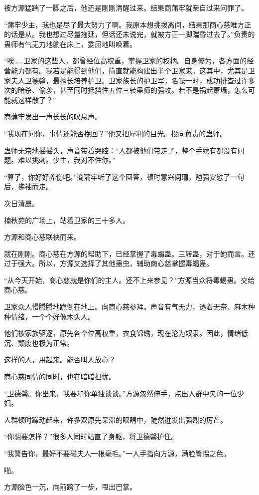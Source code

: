 \begin{this_body}
被方源猛踹了一脚之后，他还是刚刚清醒过来。结果商蒲牢就亲自过来问罪了。

“蒲牢少主，我也是尽了最大努力了啊。我原本想挑拨离间，结果那商心慈唯方正的话是从。我也想过尽量拖延，但话还未说完，就被方正一脚踹昏过去了。”负责的蛊师有气无力地躺在床上，委屈地叫唤着。

“唉……卫家的这些人，都曾经位高权重，掌握卫家的权柄。自身修为，各方面的经营能力都有。我若是能得到他们，简直就能构建出半个卫家来。这其中，尤其是卫家夫人卫德馨，最擅长培养护卫。卫家族长的护卫军，名噪一时，成功排查过许多次的暗杀、偷袭，甚至同时抵挡住五位三转蛊师的强攻。若不是祸起萧墙，怎么可能就这样散了？”

商蒲牢发出一声长长的叹息声。

“我现在问你，事情还能否挽回？”他又把犀利的目光。投向负责的蛊师。

蛊师无奈地摇摇头，声音带着哭腔：“人都被他们带走了，整个手续有都没有问题。难以挑刺。少主，我对不住你。”

“算了，你好好养伤吧。”商蒲牢听了这个回答，顿时意兴阑珊，勉强安慰了一句后，拂袖而走。

次日清晨。

楠秋苑的广场上，站着卫家的三十多人。

方源和商心慈联袂而来。

就在刚刚。商心慈在方源的帮助下，已经掌握了毒蝎蛊。三转蛊，对于她而言。还过于强大。所以，方源又选择了其他蛊虫，辅助商心慈掌握毒蝎蛊。

“从今天开始，商心慈就是你们的主人。还不上来参见？”方源当众将毒蝎蛊。交给商心慈。

卫家众人慢腾腾地跪倒在地上。向商心慈参拜。声音有气无力，透着无奈、麻木种种情绪，一个个好像木头人。

他们被家族驱逐，原先各个位高权重，衣食锦绣，现在沦为奴隶。因此，情绪低沉、颓废也极为正常。

这样的人，用起来。能否叫人放心？

商心慈同情的同时，也在暗暗担忧。

“卫德馨。你出来，我要和你单独谈谈。”方源忽然伸手，点出人群中央的一位少妇。

人群顿时躁动起来，许多双原先呆滞的眼睛中，陡然迸发出强烈的厉芒。

“你想要怎样？”很多人同时站直了身躯，将卫德馨护住。

“我警告你，最好不要碰夫人一根毫毛。”一人手指向方源，满脸警惕之色。

啪。

方源脸色一沉，向前跨了一步，甩出巴掌。


\end{this_body}
